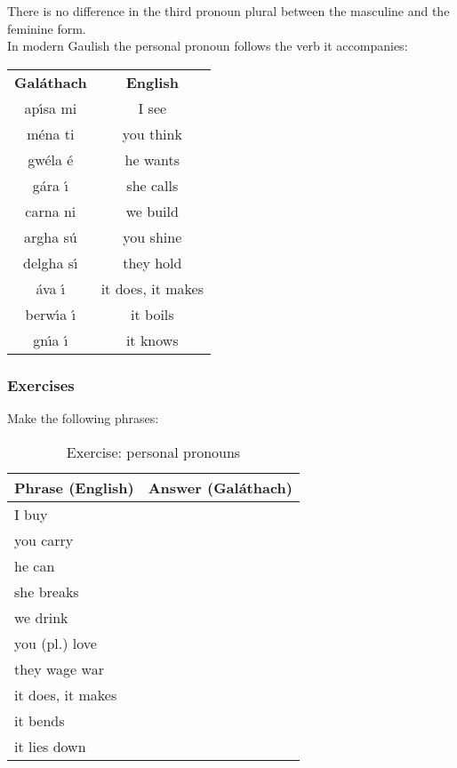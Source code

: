 There is no difference in the third pronoun plural between the masculine and the feminine form.\\

In modern Gaulish the personal pronoun follows the verb it accompanies:
\begin{table}[H]
\centering
\begin{tabular}{cc}
  \toprule
  \textbf{Gal\'{a}thach} & \textbf{English}\\
  \cmidrule(lr){1-1}\cmidrule{2-2}
  ap\'{\i}sa mi & I see\\
  m\'{e}na ti & you think\\
  gw\'{e}la \'{e} & he wants\\
  g\'{a}ra \'{\i} & she calls\\
  carna ni & we build\\
  argha s\'{u} & you shine\\
  delgha s\'{\i} & they hold\\
  \'{a}va \'{\i} & it  does, it makes\\
  berw\'{\i}a \'{\i} & it boils\\
  gn\'{\i}a \'{\i} & it knows\\
  \bottomrule
\end{tabular}
\label{examples_personal_pronoun}
\end{table}

\newpage
\subsubsection{Exercises}

Make the following phrases:\\
\begin{table}[H]
\centering
\begin{tabular}{|l|M{10.0cm}|}
  \toprule
  \textbf{Phrase (English)} & \textbf{Answer (Gal\'{a}thach)}\\
  \toprule
  I buy & \\
  \midrule
  you carry & \\
  \midrule
  he can & \\
  \midrule
  she breaks & \\
  \midrule
  we drink & \\
  \midrule
  you (pl.) love & \\
  \midrule
  they wage war & \\
  \midrule
  it does, it makes & \\
  \midrule
  it bends & \\
  \midrule
  it lies down & \\
  \bottomrule
\end{tabular}
\label{exercise_personal_pronouns}
\caption{Exercise: personal pronouns}
\end{table}

